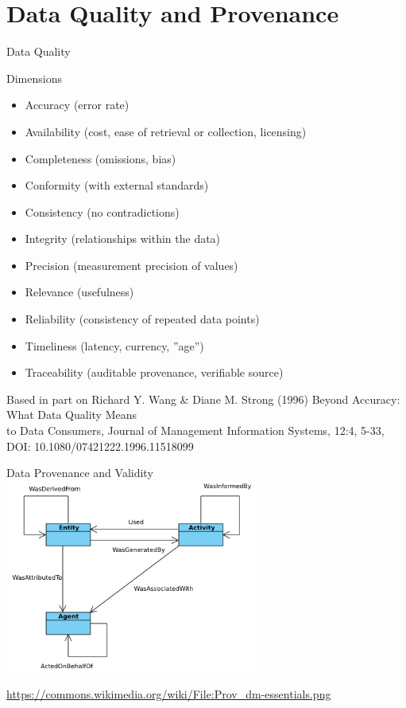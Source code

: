\documentclass[ignorenonframetext,xcolor=x11names]{beamer}
\begin{document}
\section{Data Quality and Provenance}

\begin{frame}{Data Quality}
\begin{block}{Dimensions}
\begin{itemize}
	\item Accuracy (error rate)
	\item Availability (cost, ease of retrieval or collection, licensing)
	\item Completeness (omissions, bias)
	\item Conformity (with external standards)
	\item Consistency (no contradictions)
	\item Integrity (relationships within the data)
	\item Precision (measurement precision of values)
	\item Relevance (usefulness)
	\item Reliability (consistency of repeated data points)
	\item Timeliness (latency, currency, ''age'')
	\item Traceability (auditable provenance, verifiable source)
\end{itemize}
\end{block}
\tiny{Based in part on Richard Y. Wang \& Diane M. Strong (1996) Beyond Accuracy: What Data Quality Means \\ to Data Consumers, Journal of Management Information Systems, 12:4, 5-33, \\ DOI: 10.1080/07421222.1996.11518099 }
\end{frame}

\begin{frame}{Data Provenance and Validity}
\centering
\includegraphics[height=2.5in]{Prov_dm-essentials.png}

\tiny{\url{https://commons.wikimedia.org/wiki/File:Prov_dm-essentials.png}}
\end{frame}
\end{document}
